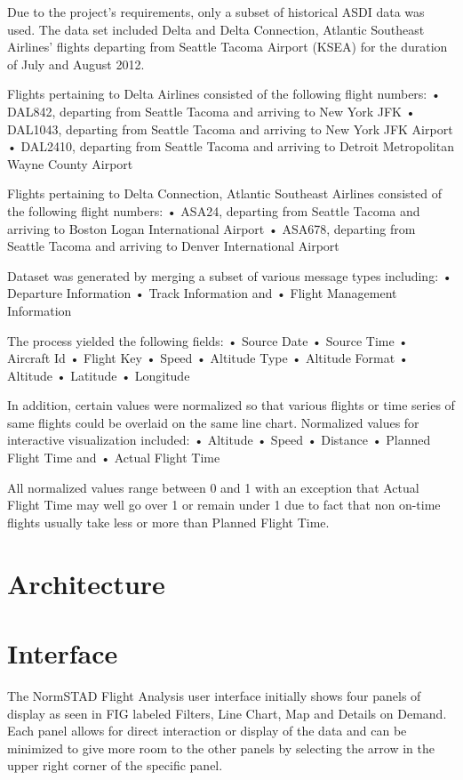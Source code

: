 \documentclass{sig-alternate}
\begin{document}
Due to the project’s requirements, only a
subset of historical ASDI data was used. The data
set included Delta and Delta Connection, Atlantic
Southeast Airlines’ flights departing from Seattle
Tacoma Airport (KSEA) for the duration of July
and August 2012.

Flights pertaining to Delta Airlines consisted
of the following flight numbers:
• DAL842, departing from Seattle Tacoma
and arriving to New York JFK
• DAL1043, departing from Seattle Tacoma
and arriving to New York JFK Airport
• DAL2410, departing from Seattle Tacoma
and arriving to Detroit Metropolitan
Wayne County Airport

Flights pertaining to Delta Connection,
Atlantic Southeast Airlines consisted of the
following flight numbers:
• ASA24, departing from Seattle Tacoma
and arriving to Boston Logan International
Airport
• ASA678, departing from Seattle Tacoma
and arriving to Denver International
Airport

Dataset was generated by merging a subset of
various message types including:
• Departure Information
• Track Information and
• Flight Management Information

The process yielded the following fields:
• Source Date
• Source Time
• Aircraft Id
• Flight Key
• Speed
• Altitude Type
• Altitude Format
• Altitude
• Latitude
• Longitude

In addition, certain values were normalized
so that various flights or time series of same
flights could be overlaid on the same line chart.
Normalized values for interactive visualization
included:
• Altitude
• Speed
• Distance
• Planned Flight Time and
• Actual Flight Time

All normalized values range between 0 and 1
with an exception that Actual Flight Time may
well go over 1 or remain under 1 due to fact
that non on-time flights usually take less or
more than Planned Flight Time.

\section{Architecture}
\label{sec-architecture}

\section{Interface}
\label{sec-interface}

The NormSTAD Flight Analysis user interface initially shows four panels of display as seen in 
FIG labeled Filters, Line Chart, Map and Details on Demand. Each panel allows for 
direct interaction or display of the data and can be minimized to
give more room to the other panels by selecting 
the arrow in the upper right corner of the specific panel. 
\end{document}
